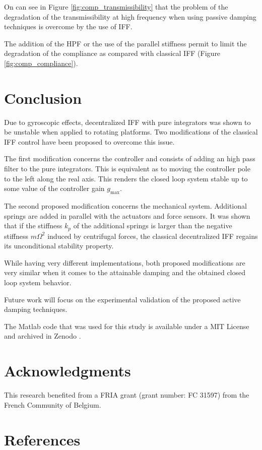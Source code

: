 \documentclass[10pt]{iopart}
\begin{document}
On can see in Figure \ref{fig:comp_transmissibility} that the problem of the degradation of the transmissibility at high frequency when using passive damping techniques is overcome by the use of IFF.

The addition of the HPF or the use of the parallel stiffness permit to limit the degradation of the compliance as compared with classical IFF (Figure \ref{fig:comp_compliance}).

\section{Conclusion}
\label{sec:org68f7028}
\label{sec:conclusion}

Due to gyroscopic effects, decentralized IFF with pure integrators was shown to be unstable when applied to rotating platforms.
Two modifications of the classical IFF control have been proposed to overcome this issue.

The first modification concerns the controller and consists of adding an high pass filter to the pure integrators.
This is equivalent as to moving the controller pole to the left along the real axis.
This renders the closed loop system stable up to some value of the controller gain \(g_\text{max}\).

The second proposed modification concerns the mechanical system.
Additional springs are added in parallel with the actuators and force sensors.
It was shown that if the stiffness \(k_p\) of the additional springs is larger than the negative stiffness \(m \Omega^2\) induced by centrifugal forces, the classical decentralized IFF regains its unconditional stability property.

While having very different implementations, both proposed modifications are very similar when it comes to the attainable damping and the obtained closed loop system behavior.

Future work will focus on the experimental validation of the proposed active damping techniques.

The Matlab code that was used for this study is available under a MIT License and archived in Zenodo \cite{dehaeze20_activ_dampin_rotat_posit_platf}.

\section*{Acknowledgments}
\label{sec:org49166ff}
This research benefited from a FRIA grant (grant number: FC 31597) from the French Community of Belgium.

\section*{References}
\label{sec:org8c97a5c}


\end{document}
